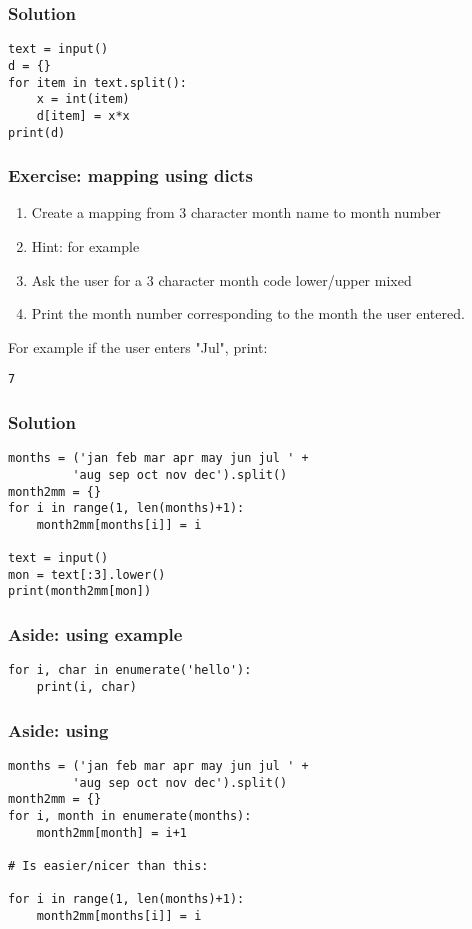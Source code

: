 \documentclass[14pt,compress]{beamer}
\begin{document}
\begin{frame}
\frametitle{Solution}
\begin{lstlisting}
text = input()
d = {}
for item in text.split():
    x = int(item)
    d[item] = x*x
print(d)
\end{lstlisting}
\end{frame}


\begin{frame}
  \frametitle{Exercise: mapping using dicts}
  \begin{enumerate}
  \item Create a mapping from 3 character month name to month number
  \item Hint: for example 
  \item Ask the user for a 3 character month code lower/upper mixed
  \item Print the month number corresponding to the month the user entered.
  \end{enumerate}
For example if the user enters "Jul", print:
\begin{lstlisting}
7
\end{lstlisting}
\end{frame}

\begin{frame}
\frametitle{Solution}
\begin{lstlisting}
months = ('jan feb mar apr may jun jul ' +
         'aug sep oct nov dec').split()
month2mm = {}
for i in range(1, len(months)+1):
    month2mm[months[i]] = i

text = input()
mon = text[:3].lower()
print(month2mm[mon])
\end{lstlisting}
\end{frame}

\begin{frame}
\frametitle{Aside: using  example}
\begin{lstlisting}
for i, char in enumerate('hello'):
    print(i, char)
\end{lstlisting}
\end{frame}

\begin{frame}
\frametitle{Aside: using }
\begin{lstlisting}
months = ('jan feb mar apr may jun jul ' +
         'aug sep oct nov dec').split()
month2mm = {}
for i, month in enumerate(months):
    month2mm[month] = i+1

# Is easier/nicer than this:

for i in range(1, len(months)+1):
    month2mm[months[i]] = i
\end{lstlisting}

\end{frame}
\end{document}
